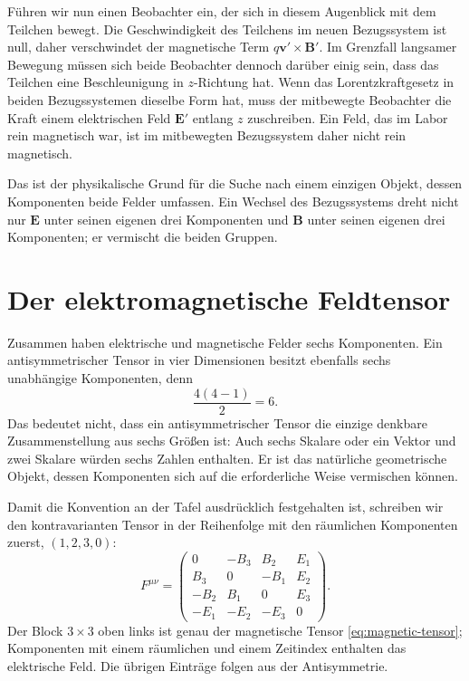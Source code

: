 Führen wir nun einen Beobachter ein, der sich in diesem Augenblick mit dem Teilchen bewegt. Die Geschwindigkeit des Teilchens im neuen Bezugssystem ist null, daher verschwindet der magnetische Term \(q\boldsymbol v'\times\boldsymbol B'\). Im Grenzfall langsamer Bewegung müssen sich beide Beobachter dennoch darüber einig sein, dass das Teilchen eine Beschleunigung in \(z\)-Richtung hat. Wenn das Lorentzkraftgesetz in beiden Bezugssystemen dieselbe Form hat, muss der mitbewegte Beobachter die Kraft einem elektrischen Feld \(\boldsymbol E'\) entlang \(z\) zuschreiben. Ein Feld, das im Labor rein magnetisch war, ist im mitbewegten Bezugssystem daher nicht rein magnetisch.

Das ist der physikalische Grund für die Suche nach einem einzigen Objekt, dessen Komponenten beide Felder umfassen. Ein Wechsel des Bezugssystems dreht nicht nur \(\boldsymbol E\) unter seinen eigenen drei Komponenten und \(\boldsymbol B\) unter seinen eigenen drei Komponenten; er vermischt die beiden Gruppen.

\section{Der elektromagnetische Feldtensor}

Zusammen haben elektrische und magnetische Felder sechs Komponenten. Ein antisymmetrischer Tensor in vier Dimensionen besitzt ebenfalls sechs unabhängige Komponenten, denn \begin{equation}
  \frac{4(4-1)}{2}=6.
\end{equation} Das bedeutet nicht, dass ein antisymmetrischer Tensor die einzige denkbare Zusammenstellung aus sechs Größen ist: Auch sechs Skalare oder ein Vektor und zwei Skalare würden sechs Zahlen enthalten. Er ist das natürliche geometrische Objekt, dessen Komponenten sich auf die erforderliche Weise vermischen können.

Damit die Konvention an der Tafel ausdrücklich festgehalten ist, schreiben wir den kontravarianten Tensor in der Reihenfolge mit den räumlichen Komponenten zuerst, \((1,2,3,0)\): \begin{equation}
  F^{\mu\nu}=
  \begin{pmatrix}
    0 & -B_3 & B_2 & E_1 \\
    B_3 & 0 & -B_1 & E_2 \\
    -B_2 & B_1 & 0 & E_3 \\
    -E_1 & -E_2 & -E_3 & 0
  \end{pmatrix}.
  \label{eq:l07-field-tensor}
\end{equation} Der Block \(3\times3\) oben links ist genau der magnetische Tensor \eqref{eq:magnetic-tensor}; Komponenten mit einem räumlichen und einem Zeitindex enthalten das elektrische Feld. Die übrigen Einträge folgen aus der Antisymmetrie.

